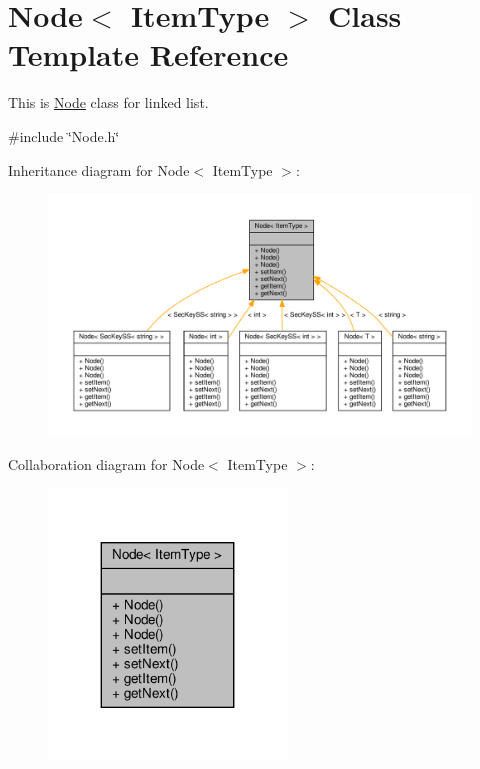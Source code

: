 \hypertarget{classNode}{}\section{Node$<$ Item\+Type $>$ Class Template Reference}
\label{classNode}


This is \hyperlink{classNode}{Node} class for linked list.  




{\ttfamily \#include \char`\"{}Node.\+h\char`\"{}}



Inheritance diagram for Node$<$ Item\+Type $>$\+:\nopagebreak
\begin{figure}[H]
\begin{center}
\leavevmode
\includegraphics[width=350pt]{classNode__inherit__graph}
\end{center}
\end{figure}


Collaboration diagram for Node$<$ Item\+Type $>$\+:\nopagebreak
\begin{figure}[H]
\begin{center}
\leavevmode
\includegraphics[width=179pt]{classNode__coll__graph}
\end{center}
\end{figure}
